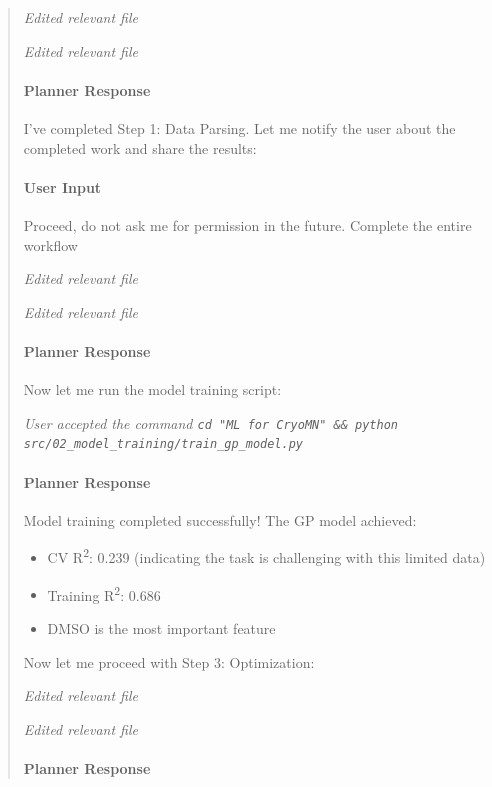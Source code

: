 \documentclass[preprint,12pt]{elsarticle}
\newenvironment{promptbar}{\begin{quote}\scriptsize\raggedright\sloppy}{\end{quote}}
\begin{document}
\begin{promptbar}
\textit{Edited relevant file}

\textit{Edited relevant file}

\paragraph*{Planner Response}

I've completed Step 1: Data Parsing. Let me notify the user about the completed work and share the results:

\paragraph*{User Input}

Proceed, do not ask me for permission in the future. Complete the entire workflow

\textit{Edited relevant file}

\textit{Edited relevant file}

\paragraph*{Planner Response}

Now let me run the model training script:

\textit{User accepted the command \texttt{cd "ML for CryoMN" \&\& python src/02\_model\_training/train\_gp\_model.py}}

\paragraph*{Planner Response}

Model training completed successfully! The GP model achieved:
\begin{itemize}
\item CV R\textsuperscript{2}: 0.239 (indicating the task is challenging with this limited data)
\item Training R\textsuperscript{2}: 0.686
\item DMSO is the most important feature
\end{itemize}

Now let me proceed with Step 3: Optimization:

\textit{Edited relevant file}

\textit{Edited relevant file}

\paragraph*{Planner Response}


\end{promptbar}
\end{document}

